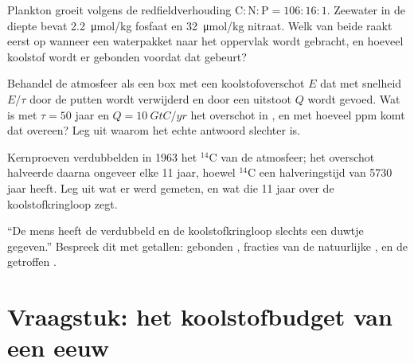 \begin{exercise}[$\star\star$]\label{exo:b2:biogeochemical-cycles:9}
Plankton groeit volgens de redfieldverhouding $\mathrm{C:N:P} = 106:16:1$.
Zeewater in de diepte bevat \qty{2.2}{\micro mol/kg} fosfaat en
\qty{32}{\micro mol/kg} nitraat. Welk van beide raakt eerst op wanneer een
waterpakket naar het oppervlak wordt gebracht, en hoeveel koolstof wordt er
gebonden voordat dat gebeurt?
\end{exercise}

\begin{exercise}[$\star\star\star$]\label{exo:b2:biogeochemical-cycles:10}
Behandel de atmosfeer als een box met een koolstofoverschot $E$ dat met snelheid
$E/\tau$ door de putten wordt verwijderd en door een uitstoot $Q$ wordt gevoed.
Wat is met $\tau =
50$ jaar en $Q = \qty{10}{GtC/yr}$ het overschot in , en met
hoeveel ppm komt dat overeen? Leg uit waarom het echte antwoord slechter is.
\end{exercise}

\begin{exercise}[$\star\star\star$]\label{exo:b2:biogeochemical-cycles:11}
Kernproeven verdubbelden in 1963 het $\mathrm{{}^{14}C}$ van de atmosfeer; het
overschot halveerde daarna ongeveer elke 11 jaar, hoewel $\mathrm{{}^{14}C}$
een halveringstijd van 5730 jaar heeft. Leg uit wat er werd gemeten, en wat
die 11 jaar over de koolstofkringloop zegt.
\end{exercise}

\begin{exercise}[$\star\star\star$]\label{exo:b2:biogeochemical-cycles:12}
``De mens heeft de  verdubbeld en de koolstofkringloop slechts
een duwtje gegeven.'' Bespreek dit met getallen: gebonden , fracties van
de natuurlijke , en de getroffen .
\end{exercise}

\section{Vraagstuk: het koolstofbudget van een eeuw}

